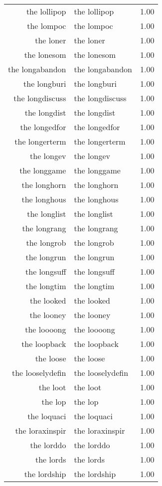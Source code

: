 \begin{table}[ht]
\begin{tabular}{rlr}
  the lollipop & the lollipop & 1.00 \\ 
  the lompoc & the lompoc & 1.00 \\ 
  the loner & the loner & 1.00 \\ 
  the lonesom & the lonesom & 1.00 \\ 
  the longabandon & the longabandon & 1.00 \\ 
  the longburi & the longburi & 1.00 \\ 
  the longdiscuss & the longdiscuss & 1.00 \\ 
  the longdist & the longdist & 1.00 \\ 
  the longedfor & the longedfor & 1.00 \\ 
  the longerterm & the longerterm & 1.00 \\ 
  the longev & the longev & 1.00 \\ 
  the longgame & the longgame & 1.00 \\ 
  the longhorn & the longhorn & 1.00 \\ 
  the longhous & the longhous & 1.00 \\ 
  the longlist & the longlist & 1.00 \\ 
  the longrang & the longrang & 1.00 \\ 
  the longrob & the longrob & 1.00 \\ 
  the longrun & the longrun & 1.00 \\ 
  the longsuff & the longsuff & 1.00 \\ 
  the longtim & the longtim & 1.00 \\ 
  the looked & the looked & 1.00 \\ 
  the looney & the looney & 1.00 \\ 
  the loooong & the loooong & 1.00 \\ 
  the loopback & the loopback & 1.00 \\ 
  the loose & the loose & 1.00 \\ 
  the looselydefin & the looselydefin & 1.00 \\ 
  the loot & the loot & 1.00 \\ 
  the lop & the lop & 1.00 \\ 
  the loquaci & the loquaci & 1.00 \\ 
  the loraxinspir & the loraxinspir & 1.00 \\ 
  the lorddo & the lorddo & 1.00 \\ 
  the lords & the lords & 1.00 \\ 
  the lordship & the lordship & 1.00 \\ 

\end{tabular}
\end{table}
